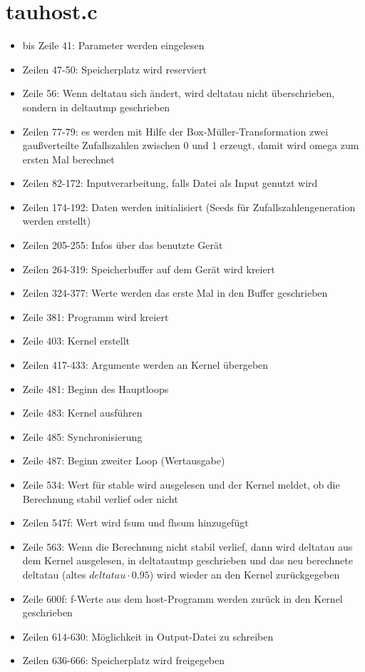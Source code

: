 \documentclass[a4paper,parskip=half,10pt]{scrartcl}
\begin{document}
\section{tauhost.c}
\begin{itemize}
\item bis Zeile 41: Parameter werden eingelesen
\item Zeilen 47-50: Speicherplatz wird reserviert
\item Zeile 56: Wenn deltatau sich ändert, wird deltatau nicht überschrieben, sondern in deltautmp geschrieben
\item Zeilen 77-79: es werden mit Hilfe der Box-Müller-Transformation zwei gaußverteilte Zufallszahlen zwischen 0 und 1 erzeugt, damit wird omega zum ersten Mal berechnet
\item Zeilen 82-172: Inputverarbeitung, falls Datei als Input genutzt wird
\item Zeilen 174-192: Daten werden initialisiert (Seeds für Zufallszahlengeneration werden erstellt)
\item Zeilen 205-255: Infos über das benutzte Gerät
\item Zeilen 264-319: Speicherbuffer auf dem Gerät wird kreiert
\item Zeilen 324-377: Werte werden das erste Mal in den Buffer geschrieben
\item Zeile 381: Programm wird kreiert
\item Zeile 403: Kernel erstellt
\item Zeilen 417-433: Argumente werden an Kernel übergeben
\item Zeile 481: Beginn des Hauptloops
  \item Zeile 483: Kernel ausführen
  \item Zeile 485: Synchronisierung
  \item Zeile 487: Beginn zweiter Loop (Wertausgabe)
\item Zeile 534: Wert für stable wird ausgelesen und der Kernel meldet, ob die Berechnung stabil verlief oder nicht
\item Zeilen 547f: Wert wird fsum und fhsum hinzugefügt
\item Zeile 563: Wenn die Berechnung nicht stabil verlief, dann wird deltatau aus dem Kernel ausgelesen, in deltatautmp geschrieben und das neu berechnete deltatau (altes $deltatau\cdot 0.95$) wird wieder an den Kernel zurückgegeben
\item Zeile 600f: f-Werte aus dem host-Programm werden zurück in den Kernel geschrieben
\item Zeilen 614-630: Möglichkeit in Output-Datei zu schreiben
\item Zeilen 636-666: Speicherplatz wird freigegeben 
\end{itemize}
\end{document}
